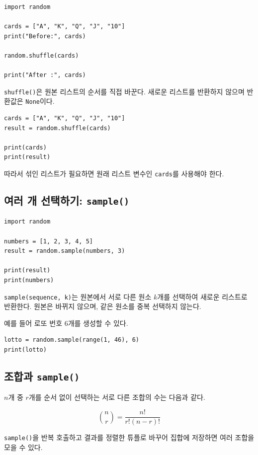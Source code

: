 \documentclass[11pt,a4paper]{article}
\begin{document}
\begin{lstlisting}
import random

cards = ["A", "K", "Q", "J", "10"]
print("Before:", cards)

random.shuffle(cards)

print("After :", cards)
\end{lstlisting}

\texttt{shuffle()}은 원본 리스트의 순서를 직접 바꾼다. 새로운 리스트를 반환하지 않으며 반환값은 \texttt{None}이다.

\begin{lstlisting}
cards = ["A", "K", "Q", "J", "10"]
result = random.shuffle(cards)

print(cards)
print(result)
\end{lstlisting}

따라서 섞인 리스트가 필요하면 원래 리스트 변수인 \texttt{cards}를 사용해야 한다.

\subsection{여러 개 선택하기: \texttt{sample()}}

\begin{lstlisting}
import random

numbers = [1, 2, 3, 4, 5]
result = random.sample(numbers, 3)

print(result)
print(numbers)
\end{lstlisting}

\texttt{sample(sequence, k)}는 원본에서 서로 다른 원소 $k$개를 선택하여 새로운 리스트로 반환한다. 원본은 바뀌지 않으며, 같은 원소를 중복 선택하지 않는다.

예를 들어 로또 번호 6개를 생성할 수 있다.

\begin{lstlisting}
lotto = random.sample(range(1, 46), 6)
print(lotto)
\end{lstlisting}

\subsection{조합과 \texttt{sample()}}

$n$개 중 $r$개를 순서 없이 선택하는 서로 다른 조합의 수는 다음과 같다.

\[
{n \choose r}=\frac{n!}{r!(n-r)!}
\]

\texttt{sample()}을 반복 호출하고 결과를 정렬한 튜플로 바꾸어 집합에 저장하면 여러 조합을 모을 수 있다.
\end{document}
